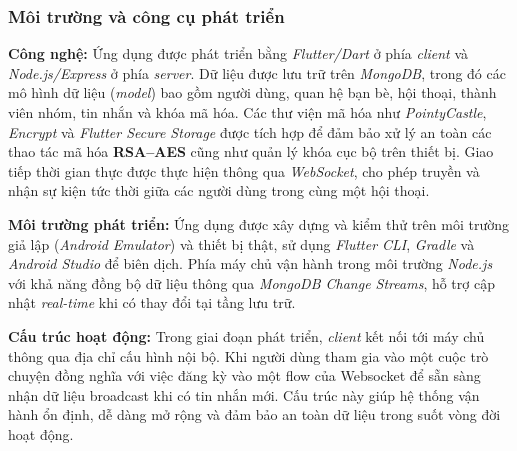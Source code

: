 \subsubsection{Môi trường và công cụ phát triển}
\indent \textbf{Công nghệ:} Ứng dụng được phát triển bằng \textit{Flutter/Dart} ở phía \textit{client} và \textit{Node.js/Express} ở phía \textit{server}.  
Dữ liệu được lưu trữ trên \textit{MongoDB}, trong đó các mô hình dữ liệu (\textit{model}) bao gồm người dùng, quan hệ bạn bè, hội thoại, thành viên nhóm, tin nhắn và khóa mã hóa.  
Các thư viện mã hóa như \textit{PointyCastle}, \textit{Encrypt} và \textit{Flutter Secure Storage} được tích hợp để đảm bảo xử lý an toàn các thao tác mã hóa \textbf{RSA–AES} cũng như quản lý khóa cục bộ trên thiết bị.  
Giao tiếp thời gian thực được thực hiện thông qua \textit{WebSocket}, cho phép truyền và nhận sự kiện tức thời giữa các người dùng trong cùng một hội thoại.

\indent \textbf{Môi trường phát triển:} Ứng dụng được xây dựng và kiểm thử trên môi trường giả lập (\textit{Android Emulator}) và thiết bị thật, sử dụng \textit{Flutter CLI}, \textit{Gradle} và \textit{Android Studio} để biên dịch.  
Phía máy chủ vận hành trong môi trường \textit{Node.js} với khả năng đồng bộ dữ liệu thông qua \textit{MongoDB Change Streams}, hỗ trợ cập nhật \textit{real-time} khi có thay đổi tại tầng lưu trữ.

\indent \textbf{Cấu trúc hoạt động:} Trong giai đoạn phát triển, \textit{client} kết nối tới máy chủ thông qua địa chỉ cấu hình nội bộ. Khi người dùng tham gia vào một cuộc trò chuyện đồng nghĩa với việc đăng kỳ vào một flow của Websocket để sẵn sàng nhận dữ liệu broadcast khi có tin nhắn mới. 
Cấu trúc này giúp hệ thống vận hành ổn định, dễ dàng mở rộng và đảm bảo an toàn dữ liệu trong suốt vòng đời hoạt động.
